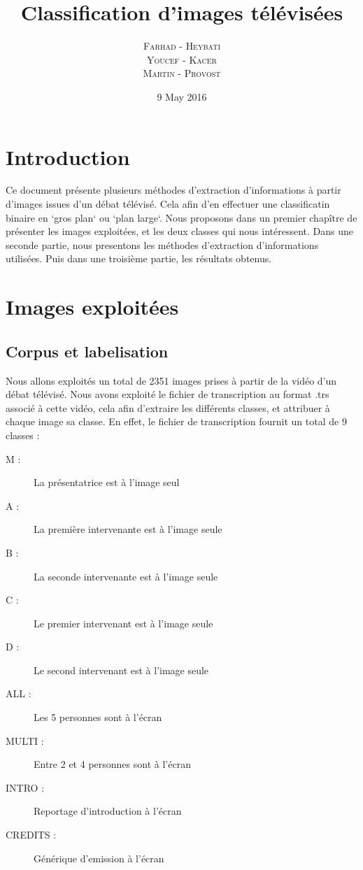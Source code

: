 \documentclass{book}
\title{Classification d'images télévisées}
\author{\textsc{Farhad} - \textsc{Heybati}\\
\textsc{Youcef} - \textsc{Kacer}\\
\textsc{Martin} - \textsc{Provost}}
\date{9 May 2016}
\begin{document}
 
\maketitle

\tableofcontents

\frontmatter
\chapter{Introduction}
Ce document présente plusieurs méthodes d'extraction d'informations à partir d'images issues d'un débat télévisé.
Cela afin d'en effectuer une classificatin binaire en `gros plan` ou `plan large`.
Nous proposons dans un premier chapître de présenter les images exploitées, et les deux classes qui nous intéressent.
Dans une seconde partie, nous presentons les méthodes d'extraction d'informations utilisées.
Puis dans une troisième partie, les résultats obtenus.

\mainmatter
\chapter{Images exploitées}
\section{Corpus et labelisation}
Nous allons exploités un total de 2351 images prises à partir de la vidéo d'un débat télévisé.
Nous avons exploité le fichier de transcription au format .trs associé à cette vidéo, cela afin d'extraire les différents classes, et attribuer à chaque image sa classe.
En effet, le fichier de transcription fournit un total de 9 classes :

\begin{description} %

\item[M :] La présentatrice est à l'image seul
\item[A :] La première intervenante est à l'image seule
\item[B :] La seconde intervenante est à l'image seule
\item[C :] Le premier intervenant est à l'image seule
\item[D :] Le second intervenant est à l'image seule
\item[ALL :] Les 5 personnes sont à l'écran
\item[MULTI :] Entre 2 et 4 personnes sont à l'écran
\item[INTRO :] Reportage d'introduction à l'écran
\item[CREDITS :] Générique d'emission à l'écran

\end{description}
\end{document}
